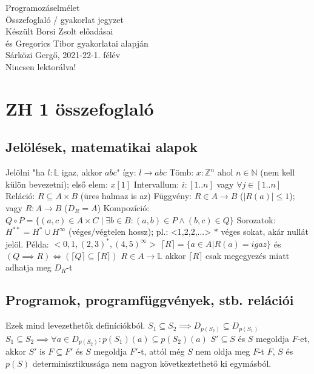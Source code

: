 \documentclass[12pt,a4paper]{article}
\begin{document}
\begin{center}
	\huge
	Programozáselmélet\\
	\vspace{1mm}
	\LARGE
	Összefoglaló / gyakorlat jegyzet\\
	\vspace{5mm}
	\large
	Készült Borsi Zsolt előadásai\\
	és Gregorics Tibor gyakorlatai alapján\\
	\vspace{5mm}
	Sárközi Gergő, 2021-22-1. félév\\
	Nincsen lektorálva!
\end{center}

\tableofcontents

\pagebreak

\section{ZH 1 összefoglaló}

\subsection{Jelölések, matematikai alapok}

\begin{outline}
	\1 Jelölni "ha $l : \mathbb{L}$ igaz, akkor $abc$" így: $l \to abc$
	\1 Tömb: $x : \mathbb{Z}^n$ ahol $n \in \mathbb{N}$ (nem kell külön bevezetni); első elem: $x[1]$
	\1 Intervallum: $i: [1..n]$ vagy $\forall j \in [1..n]$
	\1 Reláció: $R \subseteq A \times B$ (üres halmaz is az)
	\1 Függvény: $R \in A \to B$ ($|R(a)|\le1$); vagy $R : A \to B$ ($D_R=A$)
	\1 Kompozíció: $Q \circ P=\{(a,c) \in A \times C \;|\; \exists b \in B: (a,b) \in P \wedge (b,c) \in Q\}$
	\1 Sorozatok: $H^{**} = H^* \cup H^\infty$ (véges/végtelen hossz); \; pl.: <1,2,2,...>
		\2 $*$ véges sokat, akár nullát jelöl. Példa: $<0,1,(2,3)^*,(4,5)^\infty>$
	\1 $\lceil R \rceil = \{a \in A | R(a) = igaz\}$ és $(Q \implies R) \Leftrightarrow (\lceil Q \rceil \subseteq \lceil R \rceil)$
		\2 $R \in A \to \mathbb{L}$ akkor $\lceil R \rceil$ csak megegyezés miatt adhatja meg $D_R$-t
\end{outline}

\subsection{Programok, programfüggvények, stb. relációi}

\begin{outline}
	\1 Ezek mind levezethetők definíciókból.
	\1 $S_1 \subseteq S_2 \implies D_{p(S_2)} \subseteq D_{p(S_1)}$
	\1 $S_1 \subseteq S_2 \implies \forall a \in D_{p(S_2)}: p(S_1)(a) \subseteq p(S_2)(a)$
	\1 $S' \subseteq S$ és $S$ megoldja $F$-et, akkor $S'$ is
	\1 $F \subseteq F'$ és $S$ megoldja $F'$-t, attól még $S$ nem oldja meg $F$-t
	\1 $F$, $S$ és $p(S)$ determinisztikussága nem nagyon következtethető ki egymásból.
\end{outline}
\end{document}
